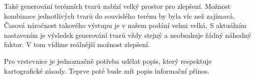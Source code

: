 \documentclass[12pt]{article}
\begin{document}
Také generování terénních tvarů nabízí velký prostor pro zlepšení. Možnost kombinace jednotlivých tvarů do souvislého terénu by byla víc než zajímavá. Časová náročnost takového výstupu je v našem podání velmi velká. S aktuálním nastavením je výsledek generování tvarů vždy stejný a neobsahuje žádný náhodný faktor. V tom vídíme reálnější možnost zlepšení.

Pro vrstevnice je jednoznačně potřeba udělat popis, který respektuje kartografické zásady. Teprve poté bude mít popis informační přínos.


\newpage

\listoffigures





\nocite{*}
{}


   
\end{document}
